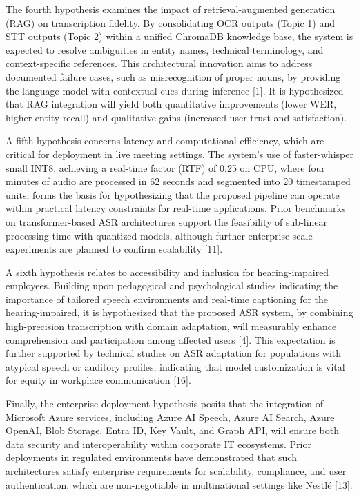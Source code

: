 \documentclass[12pt,a4paper]{article}
\begin{document}
The fourth hypothesis examines the impact of retrieval-augmented generation (RAG) on transcription fidelity. By consolidating OCR outputs (Topic 1) and STT outputs (Topic 2) within a unified ChromaDB knowledge base, the system is expected to resolve ambiguities in entity names, technical terminology, and context-specific references. This architectural innovation aims to address documented failure cases, such as misrecognition of proper nouns, by providing the language model with contextual cues during inference [1]. It is hypothesized that RAG integration will yield both quantitative improvements (lower WER, higher entity recall) and qualitative gains (increased user trust and satisfaction).


A fifth hypothesis concerns latency and computational efficiency, which are critical for deployment in live meeting settings. The system’s use of faster-whisper small INT8, achieving a real-time factor (RTF) of 0.25 on CPU, where four minutes of audio are processed in 62 seconds and segmented into 20 timestamped units, forms the basis for hypothesizing that the proposed pipeline can operate within practical latency constraints for real-time applications. Prior benchmarks on transformer-based ASR architectures support the feasibility of sub-linear processing time with quantized models, although further enterprise-scale experiments are planned to confirm scalability [11].


A sixth hypothesis relates to accessibility and inclusion for hearing-impaired employees. Building upon pedagogical and psychological studies indicating the importance of tailored speech environments and real-time captioning for the hearing-impaired, it is hypothesized that the proposed ASR system, by combining high-precision transcription with domain adaptation, will measurably enhance comprehension and participation among affected users [4]. This expectation is further supported by technical studies on ASR adaptation for populations with atypical speech or auditory profiles, indicating that model customization is vital for equity in workplace communication [16].


Finally, the enterprise deployment hypothesis posits that the integration of Microsoft Azure services, including Azure AI Speech, Azure AI Search, Azure OpenAI, Blob Storage, Entra ID, Key Vault, and Graph API, will ensure both data security and interoperability within corporate IT ecosystems. Prior deployments in regulated environments have demonstrated that such architectures satisfy enterprise requirements for scalability, compliance, and user authentication, which are non-negotiable in multinational settings like Nestlé [13].
\end{document}
